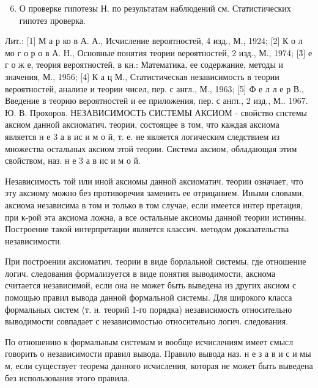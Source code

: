 \documentclass[10pt]{article}
\begin{document}
\begin{enumerate}

  \setcounter{enumi}{5}

  \item О проверке гипотезы Н. по результатам наблюдений см. Статистических гипотез проверка.

\end{enumerate}



Лит.: [1] М а р ко в А. А., Исчисление вероятностей, 4 изд., М., 1924; [2] К о л мо г о р о в А. Н., Основные понятия теории вероятностей, 2 изд., М., 1974; [3̉] е г о ж е, теория вероятностей, в кн.: Математика, ее содержание, методы и значения, М., 1956; [4] К а ц М., Статистическая независимость в теории вероятностей, анализе и теории чисел, пер. с англ., М., 1963; [5] Ф е л л е р В., Введение в теорию вероятностей и ее приложения, пер. с англ., 2 изд., М.. 1967. Ю. В. Прохоров. НЕЗАВИСИМОСТЬ СИСТЕМЫ АКСИОМ - свойство спстемы аксиом данной аксиоматич. теории, состоящее в том, что каждая аксиома является н е 3 а в ис и м о й, т. е. не является логическим следствием из множества остальных аксиом этой теории. Система аксиом, обладающая этим свойством, наз. н е 3 а в ис и м о й.



Независимость той или иной аксиомы данной аксиоматич. теории означает, что эту аксиому можно без противоречия заменить ее отрицанием. Иными словами, аксиома независима в том и только в том случае, если имеется интер претация, при к-рой эта аксиома ложна, а все остальные аксиомы данной теории истинны. Построение такой интерпретации является классич. методом доказательства независимости.



При построении аксиоматич. теории в виде борлальной системы, где отношение логич. следования формализуется в виде понятия выводимости, аксиома считается независимой, если она не может быть выведена из других аксиом с помощью правил вывода данной формальной системы. Для широкого класса формальных систем (т. н. теорий 1-го порядка) независимость относительно выводимости совпадает с независимостью относительно логич. следования.



По отношению к формальным системам и вообще исчислениям имеет смысл говорить о независимости правил вывода. Правило вывода наз. н е з а в и с и мы м, если существует теорема данного исчисления, которая не может быть выведена без использования этого правила.
\end{document}
